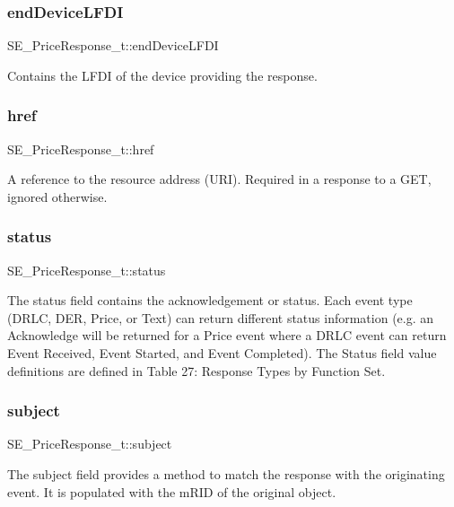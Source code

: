 \subsubsection{\texorpdfstring{end\+Device\+L\+F\+DI}{endDeviceLFDI}}
{\footnotesize\ttfamily S\+E\+\_\+\+Price\+Response\+\_\+t\+::end\+Device\+L\+F\+DI}

Contains the L\+F\+DI of the device providing the response. \mbox{\label{group__PriceResponse_ga74e2af000045c4743754d6a2c585fbed}} 
\subsubsection{\texorpdfstring{href}{href}}
{\footnotesize\ttfamily S\+E\+\_\+\+Price\+Response\+\_\+t\+::href}

A reference to the resource address (U\+RI). Required in a response to a G\+ET, ignored otherwise. \mbox{\label{group__PriceResponse_ga1660cfe81626577fdff445d0503634ff}} 
\subsubsection{\texorpdfstring{status}{status}}
{\footnotesize\ttfamily S\+E\+\_\+\+Price\+Response\+\_\+t\+::status}

The status field contains the acknowledgement or status. Each event type (D\+R\+LC, D\+ER, Price, or Text) can return different status information (e.\+g. an Acknowledge will be returned for a Price event where a D\+R\+LC event can return Event Received, Event Started, and Event Completed). The Status field value definitions are defined in Table 27\+: Response Types by Function Set. \mbox{\label{group__PriceResponse_ga63c19ee87750d603c251c988496b702e}} 
\subsubsection{\texorpdfstring{subject}{subject}}
{\footnotesize\ttfamily S\+E\+\_\+\+Price\+Response\+\_\+t\+::subject}

The subject field provides a method to match the response with the originating event. It is populated with the m\+R\+ID of the original object. 